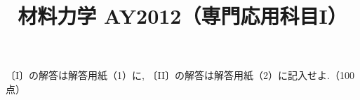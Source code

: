 \documentclass[11pt,a4paper]{article}
\title{材料力学 AY2012（専門応用科目I）}
\author{}
\date{}
\begin{document}
\maketitle

\noindent
〔I〕の解答は解答用紙（1）に, 〔II〕の解答は解答用紙（2）に記入せよ.\hfill（100 点）

\bigskip

\clearpage

\end{document}
